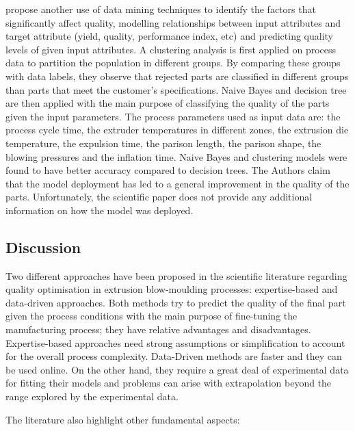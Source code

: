 \citet{ramana2013data} propose another use of data mining techniques to identify the factors that significantly affect quality, modelling relationships between input attributes and target attribute (yield, quality, performance index, etc) and predicting quality levels of given input attributes. A clustering analysis is first applied on process data to partition the population in different groups. By comparing these groups with data labels, they observe that rejected parts are classified in different groups than parts that meet the customer's specifications. Naive Bayes and decision tree are then applied with the main purpose of classifying the quality of the parts given the input parameters. The process parameters used as input data are: the process cycle time, the extruder temperatures in different zones, the extrusion die temperature, the expulsion time, the parison length, the parison shape, the blowing pressures and the inflation time. Naive Bayes and clustering models were found to have better accuracy compared to decision trees. The Authors claim that the model deployment has led to a general improvement in the quality of the parts. Unfortunately, the scientific paper does not provide any additional information on how the model was deployed. 

\subsection{Discussion} \label{Discussion}

Two different approaches have been proposed in the  scientific literature regarding quality optimisation in extrusion blow-moulding processes: expertise-based and data-driven approaches. Both methods try to predict the quality of the final part given the process conditions with the main purpose of fine-tuning the manufacturing process; they have relative advantages and disadvantages. Expertise-based approaches need strong assumptions or simplification to account for the overall process complexity. Data-Driven methods are faster and they can be used online. On the other hand, they require a great deal of experimental data for fitting their models and problems can arise with extrapolation beyond the range explored by the experimental data. 

The literature also highlight other fundamental aspects:

